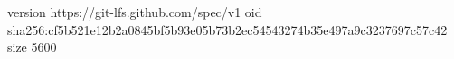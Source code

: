 version https://git-lfs.github.com/spec/v1
oid sha256:cf5b521e12b2a0845bf5b93e05b73b2ec54543274b35e497a9c3237697c57c42
size 5600
